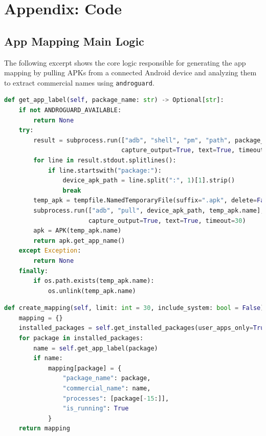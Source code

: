 \documentclass[a4paper,12pt]{report}
\begin{document}
\chapter{Appendix: Code}
\label{appendix:app-mapper-code}

\section*{App Mapping Main Logic}

The following excerpt shows the core logic responsible for generating the app mapping by pulling APKs from a connected Android device and analyzing them to extract commercial names using \texttt{androguard}.



\begin{lstlisting}[language=Python]
def get_app_label(self, package_name: str) -> Optional[str]:
    if not ANDROGUARD_AVAILABLE:
        return None
    try:
        result = subprocess.run(["adb", "shell", "pm", "path", package_name],
                                capture_output=True, text=True, timeout=10)
        for line in result.stdout.splitlines():
            if line.startswith("package:"):
                device_apk_path = line.split(":", 1)[1].strip()
                break
        temp_apk = tempfile.NamedTemporaryFile(suffix=".apk", delete=False)
        subprocess.run(["adb", "pull", device_apk_path, temp_apk.name],
                       capture_output=True, text=True, timeout=30)
        apk = APK(temp_apk.name)
        return apk.get_app_name()
    except Exception:
        return None
    finally:
        if os.path.exists(temp_apk.name):
            os.unlink(temp_apk.name)
\end{lstlisting}


\newpage
\begin{lstlisting}[language=Python]
def create_mapping(self, limit: int = 30, include_system: bool = False) -> Dict[str, Dict]:
    mapping = {}
    installed_packages = self.get_installed_packages(user_apps_only=True)
    for package in installed_packages:
        name = self.get_app_label(package)
        if name:
            mapping[package] = {
                "package_name": package,
                "commercial_name": name,
                "processes": [package[-15:]],
                "is_running": True
            }
    return mapping
\end{lstlisting}
\end{document}
